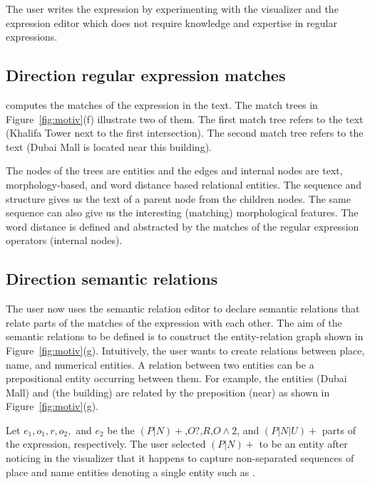 \begin{appendices}
The user writes the expression by experimenting with the visualizer and 
the expression editor which does not
require knowledge and expertise in regular expressions. 

\subsection*{Direction regular expression matches}

\framework computes the matches of the expression in the text. 
The match trees in Figure~\ref{fig:motiv}(f) illustrate two of them. 
The first match tree refers to the text 
(Khalifa Tower next to 
the first intersection). 
The second match tree refers to the text 
(Dubai Mall is located near this building).

The nodes of the trees are entities and the edges and internal nodes are text, morphology-based, 
and word distance based relational entities. 
The sequence and structure gives us the text of a parent node from the children nodes. 
The same sequence can also give us the interesting (matching) morphological features. 
The word distance is defined and abstracted by the matches of the regular expression operators (internal nodes).

\subsection*{Direction semantic relations}

The user now uses the semantic relation editor to declare semantic relations that relate 
parts of the matches of the expression with each other. 
The aim of the semantic relations to be defined is to construct the entity-relation 
graph shown in Figure~\ref{fig:motiv}(g). 
Intuitively, 
the user wants to create relations between place, name, and numerical entities. 
A relation between two entities can be a prepositional entity occurring between them. 
For example, the entities (Dubai Mall) and (the building) are 
related by the preposition (near) as shown in Figure~\ref{fig:motiv}(g).

Let $e_1,o_1,r,o_2,$ and $e_2$ be the 
$(P|N)+$,$O?$,$R$,$O\wedge 2$, and $(P|N|U)+$ parts of the expression, respectively.
The user selected $(P|N)+$ to be an entity after noticing in the visualizer  that it happens to capture 
non-separated sequences of place and name entities denoting a single entity such as .


\end{appendices}
